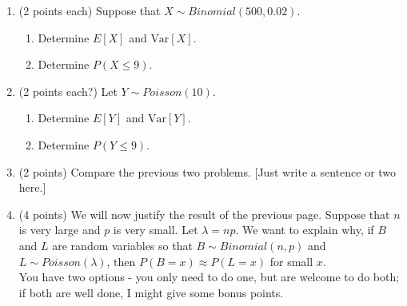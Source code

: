 \documentclass[11pt]{article}
\newenvironment{solution}
  {\textit{Solution.}}
\newcommand{\sol}[1]{
    \begin{customframedproof}[linecolor=orangehdx!75,]
        \begin{solution}
        #1
        \end{solution}
    \end{customframedproof}
}
\begin{document}
\begin{enumerate}
    \item (2 points each) Suppose that \(X \sim Binomial(500, 0.02)\).
    \begin{enumerate}
        \item Determine \(E[X]\) and \(\text{Var}[X]\).
        \item Determine \(P(X \leq 9)\).
    \end{enumerate}
    \item (2 points each?) Let \(Y \sim Poisson(10)\).
    \begin{enumerate}
        \item Determine \(E[Y]\) and \(\text{Var}[Y]\).
        \item Determine \(P(Y \leq 9)\).
    \end{enumerate}
    \item (2 points) Compare the previous two problems. [Just write a sentence or two here.]
\newpage


    \item (4 points) We will now justify the result of the previous page. Suppose that \(n\) is very large and \(p\) is very small. Let \(\lambda = np\). We want to explain why, if \(B\) and \(L\) are random variables so that \(B \sim Binomial(n,p)\) and \(L \sim Poisson(\lambda)\), then \(P(B = x) \approx P(L = x)\) for small \(x\). \\[0.5em]
    You have two options - you only need to do one, but are welcome to do both; if both are well done, I might give some bonus points.


\end{enumerate}
\end{document}
